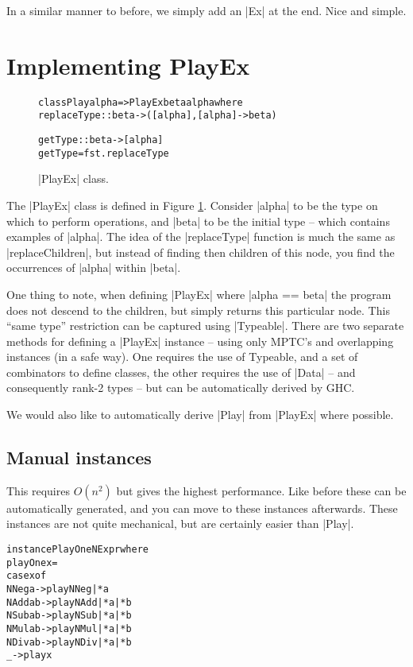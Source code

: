 \documentclass[preprint]{sigplanconf}
\newenvironment{code}{\begin{alltt}\small}{\end{alltt}}
\begin{document}
In a similar manner to before, we simply add an |Ex| at the end. Nice and simple.


\section{Implementing PlayEx}


\begin{figure}
\begin{code}
class Play alpha => PlayEx beta alpha where
    replaceType :: beta -> ([alpha], [alpha] -> beta)

    getType :: beta -> [alpha]
    getType = fst . replaceType
\end{code}
\caption{|PlayEx| class.}
\label{fig:playex}
\end{figure}


The |PlayEx| class is defined in Figure \ref{fig:playex}. Consider |alpha| to be the type on which to perform operations, and |beta| to be the initial type -- which contains examples of |alpha|. The idea of the |replaceType| function is much the same as |replaceChildren|, but instead of finding then children of this node, you find the occurrences of |alpha| within |beta|.

One thing to note, when defining |PlayEx| where |alpha == beta| the program does not descend to the children, but simply returns this particular node. This ``same type'' restriction can be captured using |Typeable|. There are two separate methods for defining a |PlayEx| instance -- using only MPTC's and overlapping instances (in a safe way). One requires the use of Typeable, and a set of combinators to define classes, the other requires the use of |Data| -- and consequently rank-2 types -- but can be automatically derived by GHC.

We would also like to automatically derive |Play| from |PlayEx| where possible.

\subsection{Manual instances}

This requires $O(n^2)$ but gives the highest performance. Like before these can be automatically generated, and you can move to these instances afterwards. These instances are not quite mechanical, but are certainly easier than |Play|.

\begin{code}
instance PlayOne NExpr where
    playOne x =
        case x of
            NNeg  a    -> play NNeg |* a
            NAdd  a b  -> play NAdd |* a |* b
            NSub  a b  -> play NSub |* a |* b
            NMul  a b  -> play NMul |* a |* b
            NDiv  a b  -> play NDiv |* a |* b
            _          -> play x
\end{code}
\end{document}
